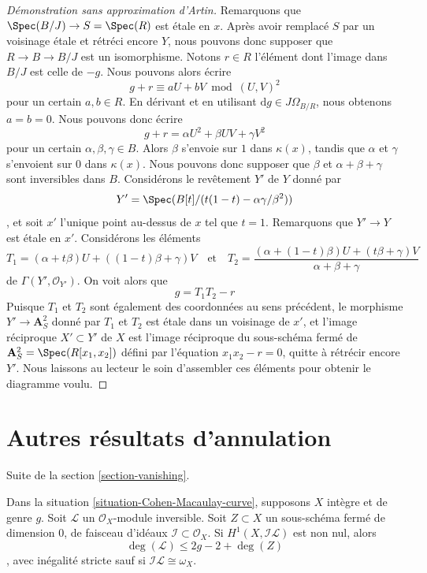 \begin{proof}[Démonstration sans approximation d'Artin]
\medskip\noindent
Remarquons que $\Spec(B/J) \to S = \Spec(R)$ est étale en $x$. Après avoir remplacé $S$ par un voisinage étale et rétréci encore $Y$, nous pouvons donc supposer que $R \to B \to B/J$ est un isomorphisme. Notons $r \in R$ l'élément dont l'image dans $B/J$ est celle de $-g$. Nous pouvons alors écrire $$
g + r \equiv a U + b V \bmod (U, V)^2
$$ pour un certain $a, b \in R$. En dérivant et en utilisant $\text{d}g \in J\Omega_{B/R}$, nous obtenons $a = b = 0$. Nous pouvons donc écrire $$
g + r = \alpha U^2 + \beta UV + \gamma V^2
$$ pour un certain $\alpha, \beta, \gamma \in B$. Alors $\beta$ s'envoie sur $1$ dans $\kappa(x)$, tandis que $\alpha$ et $\gamma$ s'envoient sur $0$ dans $\kappa(x)$. Nous pouvons donc supposer que $\beta$ et $\alpha + \beta + \gamma$ sont inversibles dans $B$. Considérons le revêtement $Y'$ de $Y$ donné par $$
Y' = \Spec(B[t]/(t(1 - t) - \alpha \gamma / \beta^2))
$$, et soit $x'$ l'unique point au-dessus de $x$ tel que $t = 1$. Remarquons que $Y' \to Y$ est étale en $x'$. Considérons les éléments $$
T_1 = (\alpha + t \beta)U + ((1 - t)\beta + \gamma)V
\quad\text{et}\quad
T_2 =
\frac{(\alpha + (1 - t) \beta)U + (t\beta + \gamma)V}{\alpha + \beta + \gamma}
$$ de $\Gamma(Y', \mathcal{O}_{Y'})$. On voit alors que $$
g = T_1 T_2 - r
$$ Puisque $T_1$ et $T_2$ sont également des coordonnées au sens précédent, le morphisme $Y' \to \mathbf{A}^2_S$ donné par $T_1$ et $T_2$ est étale dans un voisinage de $x'$, et l'image réciproque $X' \subset Y'$ de $X$ est l'image réciproque du sous-schéma fermé de $\mathbf{A}^2_S = \Spec(R[x_1, x_2])$ défini par l'équation $x_1x_2 - r = 0$, quitte à rétrécir encore $Y'$. Nous laissons au lecteur le soin d'assembler ces éléments pour obtenir le diagramme voulu.
\end{proof}




\section{Autres résultats d'annulation}
\label{section-more-vanishing}

\noindent
Suite de la section \ref{section-vanishing}.

\begin{lemma}
\label{lemma-h1-nonzero-degree-leq-2g-2}
Dans la situation \ref{situation-Cohen-Macaulay-curve}, supposons $X$ intègre et de genre $g$. Soit $\mathcal{L}$ un $\mathcal{O}_X$-module inversible. Soit $Z \subset X$ un sous-schéma fermé de dimension $0$, de faisceau d'idéaux $\mathcal{I} \subset \mathcal{O}_X$. Si $H^1(X, \mathcal{I}\mathcal{L})$ est non nul, alors $$
\deg(\mathcal{L}) \leq 2g - 2 + \deg(Z)
$$, avec inégalité stricte sauf si $\mathcal{I}\mathcal{L} \cong \omega_X$.
\end{lemma}

